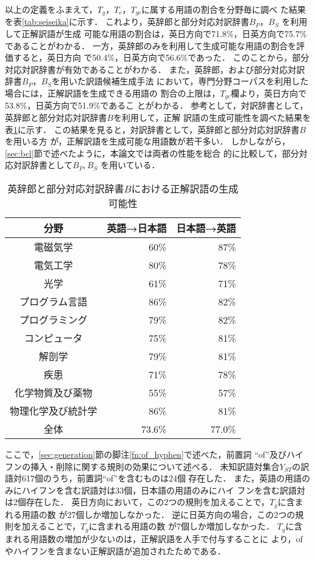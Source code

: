 \documentclass[japanese]{jnlp_1.3a}
\begin{document}
以上の定義をふまえて，$T_g$，$T_c$，$T_{gc}$に属する用語の割合を分野毎に調べ
た結果を表\ref{tab:seiseika}に示す．
これより，英辞郎と部分対応対訳辞書$B_P$，$B_S$ を利用して正解訳語が生成
可能な用語の割合は，英日方向で71.8\%，日英方向で75.7\%であることがわかる．
一方，英辞郎のみを利用して生成可能な用語の割合を評価すると，英日方向
で50.4\%，日英方向で56.6\%であった．
このことから，部分対応対訳辞書が有効であることがわかる．
また，英辞郎，および部分対応対訳辞書$B_P$，$B_S$を用いた訳語候補生成手法
において，専門分野コーパスを利用した場合には，正解訳語を生成できる用語の
割合の上限は，$T_{gc}$欄より，英日方向で53.8\%，日英方向で51.9\%であるこ
とがわかる．
参考として，対訳辞書として，英辞郎と部分対応対訳辞書$B$を利用して，正解
訳語の生成可能性を調べた結果を表\ref{tab:fujii_seiseika}に示す．
この結果を見ると，対訳辞書として，英辞郎と部分対応対訳辞書$B$を用いる方
が，正解訳語を生成可能な用語数が若干多い．
しかしながら，\ref{sec:bcl}節で述べたように，本論文では両者の性能を総合
的に比較して，部分対応対訳辞書として$B_P, B_S$ を用いている．

\begin{table}[t]
 \small
 \centering
 \caption{英辞郎と部分対応対訳辞書$B$における正解訳語の生成可能性}
 \label{tab:fujii_seiseika}
 \begin{tabular}{|c|r|r|}
  \hline
  分野 & 英語→日本語 & 日本語→英語 \\
  \hline \hline
  電磁気学           & 60\% & 87\% \\
  電気工学           & 80\% & 78\% \\
  光学               & 61\% & 71\% \\
  プログラム言語     & 86\% & 82\% \\
  プログラミング     & 79\% & 82\% \\
  コンピュータ       & 75\% & 81\% \\
  解剖学             & 79\% & 81\% \\
  疾患               & 71\% & 78\% \\
  化学物質及び薬物   & 55\% & 57\% \\
  物理化学及び統計学 & 86\% & 81\% \\
  \hline
  全体               & 73.6\% & 77.0\% \\
  \hline
 \end{tabular}
\end{table}

ここで，\ref{sec:generation}節の脚注\ref{fn:of_hyphen}で述べた，前置詞
``of''及びハイフンの挿入・削除に関する規則の効果について述べる．
未知訳語対集合$Y_{ST}$の訳語対617個のうち，前置詞``of''を含むものは24個
存在した．
また，英語の用語のみにハイフンを含む訳語対は33個，日本語の用語のみにハイ
フンを含む訳語対は2個存在した．
英日方向において，この2つの規則を加えることで，$T_g$に含まれる用語の数
が27個しか増加しなかった．
逆に日英方向の場合，この2つの規則を加えることで，$T_g$に含まれる用語の数
が7個しか増加しなかった．
$T_g$に含まれる用語数の増加が少ないのは，正解訳語を人手で付与することに
より，ofやハイフンを含まない正解訳語が追加されたためである．
\end{document}

